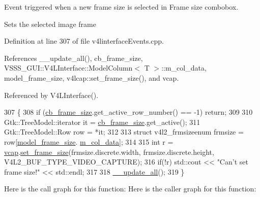 Event triggered when a new frame size is selected in Frame size combobox. 

Sets the selected image frame 

Definition at line 307 of file v4linterface\+Events.\+cpp.



References \+\_\+\+\_\+update\+\_\+all(), cb\+\_\+frame\+\_\+size, V\+S\+S\+S\+\_\+\+G\+U\+I\+::\+V4\+L\+Interface\+::\+Model\+Column$<$ T $>$\+::m\+\_\+col\+\_\+data, model\+\_\+frame\+\_\+size, v4lcap\+::set\+\_\+frame\+\_\+size(), and vcap.



Referenced by V4\+L\+Interface().


\begin{DoxyCode}
307                                                      \{
308         \textcolor{keywordflow}{if} (\hyperlink{class_v_s_s_s___g_u_i_1_1_v4_l_interface_ad6dd4704d3b7d1f262843dd148269b73}{cb\_frame\_size}.get\_active\_row\_number() == -1) \textcolor{keywordflow}{return};
309 
310         Gtk::TreeModel::iterator it = \hyperlink{class_v_s_s_s___g_u_i_1_1_v4_l_interface_ad6dd4704d3b7d1f262843dd148269b73}{cb\_frame\_size}.get\_active();
311         Gtk::TreeModel::Row row = *it;
312 
313         \textcolor{keyword}{struct }v4l2\_frmsizeenum frmsize = row[\hyperlink{class_v_s_s_s___g_u_i_1_1_v4_l_interface_a04efec56b83f5abf62316fd79ee5ef22}{model\_frame\_size}.
      \hyperlink{class_v_s_s_s___g_u_i_1_1_v4_l_interface_1_1_model_column_aa6720e1b3e47adb85d36c3ec3a2bb262}{m\_col\_data}];
314 
315         \textcolor{keywordtype}{int} r = \hyperlink{class_v_s_s_s___g_u_i_1_1_v4_l_interface_a7ece61f4ccc6d5321c445e60f34e7f33}{vcap}.\hyperlink{classv4lcap_a6ad01c926c3162e858e030c8525cb94b}{set\_frame\_size}(frmsize.discrete.width, frmsize.discrete.height, 
      V4L2\_BUF\_TYPE\_VIDEO\_CAPTURE);
316         \textcolor{keywordflow}{if}(!r) std::cout << \textcolor{stringliteral}{"Can't set frame size!"} << std::endl;
317 
318         \hyperlink{class_v_s_s_s___g_u_i_1_1_v4_l_interface_ac3fe0a20fd30c6e9505eb375ef63e52e}{\_\_update\_all}();
319     \}
\end{DoxyCode}
Here is the call graph for this function\+:
Here is the caller graph for this function\+:
\mbox{\label{class_v_s_s_s___g_u_i_1_1_v4_l_interface_a09e546d62cf2363590490c2f9e85c951}} 

